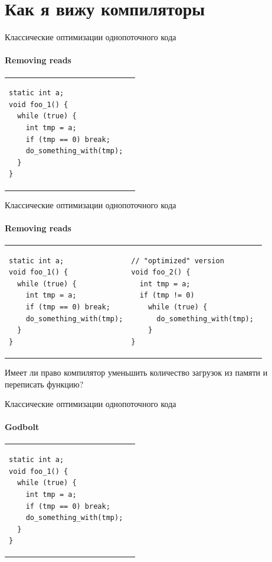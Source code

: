 

\section{Как я вижу компиляторы}
\showTOC

\begin{frame}[t,fragile]{Классические оптимизации однопоточного кода}
\framesubtitle{Removing reads}


\begin{tabular}{p{} p{}}

\begin{verbatim}
static int a;
void foo_1() {
  while (true) {
    int tmp = a;
    if (tmp == 0) break;
    do_something_with(tmp);
  }
}
\end{verbatim}

&

\end{tabular}

\end{frame}


\begin{frame}{Классические оптимизации однопоточного кода}
\framesubtitle{Removing reads}

\begin{tabular}{p{} p{}}

\begin{verbatim}
static int a;
void foo_1() {
  while (true) {
    int tmp = a;
    if (tmp == 0) break;
    do_something_with(tmp);
  }
}
\end{verbatim}

&

\begin{verbatim}
// "optimized" version
void foo_2() {
  int tmp = a;
  if (tmp != 0)
    while (true) { 
      do_something_with(tmp); 
    }
}
\end{verbatim}
\end{tabular}

Имеет ли право компилятор уменьшить количество загрузок из памяти и переписать функцию?
\end{frame}


\begin{frame}[t, fragile]{Классические оптимизации однопоточного кода}
\framesubtitle{Godbolt}


\begin{tabular}{p{} p{}}


\begin{verbatim}
static int a;
void foo_1() {
  while (true) {
    int tmp = a;
    if (tmp == 0) break;
    do_something_with(tmp);
  }
}
\end{verbatim}

&

\end{tabular}
\end{frame}


